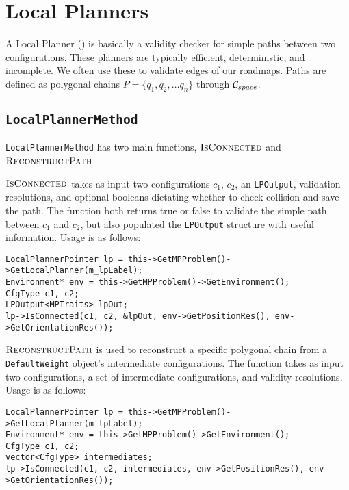 \chapter{Local Planners}

A Local Planner (\lp) is basically a validity checker for simple paths between
two configurations. These planners are typically efficient, deterministic, and
incomplete. We often use these to validate edges of our roadmaps. Paths are
defined as polygonal chains $P = \{q_1, q_2, \ldots q_n\}$ through $\mathcal{C}_{space}$.

\section{\texttt{LocalPlannerMethod}}

\texttt{LocalPlannerMethod} has two main functions, $\textsc{IsConnected}$ and
$\textsc{ReconstructPath}$.

$\textsc{IsConnected}$ takes as input two configurations $c_1$, $c_2$, an
\texttt{LPOutput}, validation resolutions, and optional booleans dictating
whether to check collision and save the path. The function both returns true or
false to validate the simple path between $c_1$ and $c_2$, but also populated
the \texttt{LPOutput} structure with useful information. Usage is as follows:
\begin{lstlisting}
LocalPlannerPointer lp = this->GetMPProblem()->GetLocalPlanner(m_lpLabel);
Environment* env = this->GetMPProblem()->GetEnvironment();
CfgType c1, c2;
LPOutput<MPTraits> lpOut;
lp->IsConnected(c1, c2, &lpOut, env->GetPositionRes(), env->GetOrientationRes());
\end{lstlisting}

$\textsc{ReconstructPath}$ is used to reconstruct a specific polygonal chain from
a \texttt{DefaultWeight} object's intermediate configurations. The function
takes as input two configurations, a set of intermediate configurations, and
validity resolutions. Usage is as follows:
\begin{lstlisting}
LocalPlannerPointer lp = this->GetMPProblem()->GetLocalPlanner(m_lpLabel);
Environment* env = this->GetMPProblem()->GetEnvironment();
CfgType c1, c2;
vector<CfgType> intermediates;
lp->IsConnected(c1, c2, intermediates, env->GetPositionRes(), env->GetOrientationRes());
\end{lstlisting}

